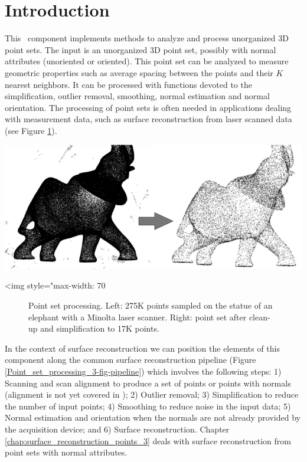\section{Introduction}

This \cgal\ component implements methods to analyze and process unorganized 3D point sets. The input is an unorganized 3D point set, possibly with normal attributes (unoriented or oriented). This point set can be analyzed to measure geometric properties such as average spacing between the points and their $K$ nearest neighbors. It can be processed with functions devoted to the simplification, outlier removal, smoothing, normal estimation and normal orientation. The processing of point sets is often needed in applications dealing with measurement data, such as surface reconstruction from laser scanned data (see Figure \ref{Point_set_processing_3-fig-introduction}).

\begin{center}
    \begin{ccTexOnly}
        \includegraphics[width=1.0\textwidth]{Point_set_processing_3/introduction} %
    \end{ccTexOnly}
    \begin{ccHtmlOnly}
        <img style="max-width: 70%
    \end{ccHtmlOnly}
    \begin{figure}[h]
        \caption{Point set processing.
                 Left: 275K points sampled on the statue of
                 an elephant with a Minolta laser scanner.
                 Right: point set after clean-up and
                 simplification to 17K points.}
        \label{Point_set_processing_3-fig-introduction}
    \end{figure}
\end{center}

In the context of surface reconstruction we can position the elements of this component along the common surface reconstruction pipeline (Figure \ref{Point_set_processing_3-fig-pipeline}) which involves the following steps: 1) Scanning and scan alignment to produce a set of points or points with normals (alignment is not yet covered in \cgal); 2) Outlier removal; 3) Simplification to reduce the number of input points; 4) Smoothing to reduce noise in the input data; 5) Normal estimation and orientation when the normals are not already provided by the acquisition device; and 6) Surface reconstruction. Chapter  \ref{chap:surface_reconstruction_points_3} deals with surface reconstruction from point sets with normal attributes.

